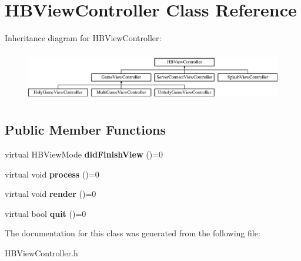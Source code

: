 \hypertarget{class_h_b_view_controller}{\section{H\-B\-View\-Controller Class Reference}
\label{class_h_b_view_controller}
}
Inheritance diagram for H\-B\-View\-Controller\-:\begin{figure}[H]
\begin{center}
\leavevmode
\includegraphics[height=2.210526cm]{class_h_b_view_controller}
\end{center}
\end{figure}
\subsection*{Public Member Functions}
\begin{DoxyCompactItemize}
\item 
\hypertarget{class_h_b_view_controller_ae5dce786709a034b56dc893bcc27a52e}{virtual H\-B\-View\-Mode {\bfseries did\-Finish\-View} ()=0}\label{class_h_b_view_controller_ae5dce786709a034b56dc893bcc27a52e}

\item 
\hypertarget{class_h_b_view_controller_a035724c01b98fdfcce78ceffc43a0b17}{virtual void {\bfseries process} ()=0}\label{class_h_b_view_controller_a035724c01b98fdfcce78ceffc43a0b17}

\item 
\hypertarget{class_h_b_view_controller_a1e99289ebec388efc9320866019ef101}{virtual void {\bfseries render} ()=0}\label{class_h_b_view_controller_a1e99289ebec388efc9320866019ef101}

\item 
\hypertarget{class_h_b_view_controller_ac247f604ad8e355e86d93157be4ea7a4}{virtual bool {\bfseries quit} ()=0}\label{class_h_b_view_controller_ac247f604ad8e355e86d93157be4ea7a4}

\end{DoxyCompactItemize}


The documentation for this class was generated from the following file\-:\begin{DoxyCompactItemize}
\item 
H\-B\-View\-Controller.\-h\end{DoxyCompactItemize}
